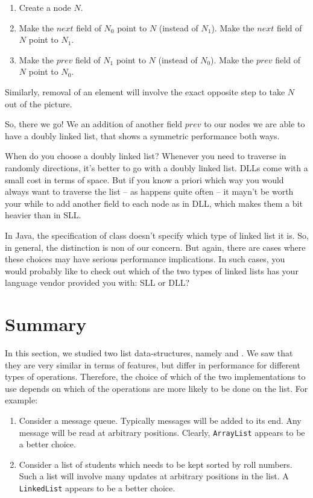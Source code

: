 \documentclass[12pt,a4paper]{article}
\begin{document}
\begin{enumerate}
	\item Create a node $N$.
	\item Make the $next$ field of $N_0$ point to $N$ (instead of $N_1$). Make the $next$ field of $N$ point to $N_1$.
	\item Make the $prev$ field of $N_1$ point to $N$ (instead of $N_0$). Make the $prev$ field of $N$ point to $N_0$.
\end{enumerate}

Similarly, removal of an element will involve the exact opposite step to take $N$ out of the picture.

So, there we go! We an addition of another field $prev$ to our nodes we are able to have a doubly linked list, that shows a symmetric performance both ways.

When do you choose a doubly linked list? Whenever you need to traverse in randomly directions, it's better to go with a doubly linked list. DLLs come with a small cost in terms of space. But if you know a priori which way you would always want to traverse the list -- as happens quite often -- it mayn't be worth your while to add another field to each node as in DLL, which makes them a bit heavier than in SLL.

In Java, the specification of \lstinline@LinkedList@ class doesn't specify which type of linked list it is. So, in general, the distinction is non of our concern. But again, there are cases where these choices may have serious performance implications. In such cases, you would probably like to check out which of the two types of linked lists has your language vendor provided you with: SLL or DLL?


\section{Summary}
In this section, we studied two list data-structures, namely \lstinline@ArrayList@ and \lstinline@LinkedList@. We saw that they are very similar in terms of features, but differ in performance for different types of operations. Therefore, the choice of which of the two implementations to use depends on which of the operations are more likely to be done on the list. For example:
\begin{enumerate}
	\item Consider a message queue. Typically messages will be added to its end. Any message will be read at arbitrary positions. Clearly, \lstinline|ArrayList| appears to be a better choice.
	\item Consider a list of students which needs to be kept sorted by roll numbers. Such a list will involve many updates at arbitrary positions in the list. A \lstinline|LinkedList| appears to be a better choice.
\end{enumerate}
\end{document}
